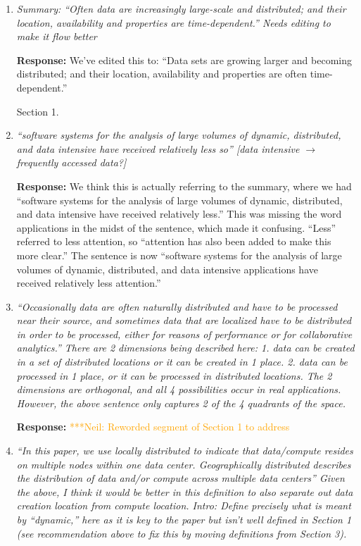 \documentclass{article}
\newcommand{\nchnote}[1]{ {\textcolor{orange} { ***Neil: #1 }}}
\newcommand{\nchnote}[1]{}
\begin{document}
\begin{enumerate}

\item \emph{Summary: ``Often data are increasingly large-scale and distributed; and their location, availability and properties are time-dependent.'' Needs editing to make it flow better}

\textbf{Response:} We've edited this to: ``Data sets are growing larger and becoming distributed; and their location, availability and properties are often time-dependent.''

\hspace{-0.7cm}Section 1. 

\item \emph{``software systems for the analysis of large volumes of dynamic, distributed, and data intensive have received relatively less so'' [data intensive $\rightarrow$ frequently accessed data?]}

\textbf{Response:} We think this is actually referring to the summary, where we had ``software systems for the analysis of large volumes of dynamic, distributed, and data intensive have received relatively less.''  This was missing the word applications in the midst of the sentence, which made it confusing. ``Less'' referred to less attention, so ``attention has also been added to make this more clear.'' The sentence is now ``software systems for the analysis of large volumes of dynamic, distributed, and data intensive applications have received relatively less attention.''

\item \emph{``Occasionally data are often naturally distributed and have to be processed near their source, and sometimes data that are localized have to be distributed in order to be processed, either for reasons of performance or for collaborative analytics.'' There are 2 dimensions being described here: 1. data can be created in a set of distributed locations or it can be created in 1 place. 2. data can be processed in 1 place, or it can be processed in distributed locations. The 2 dimensions are orthogonal, and all 4 possibilities occur in real applications. However, the above sentence only captures 2 of the 4 quadrants of the space.}

\textbf{Response:} \nchnote{Reworded segment of Section 1 to address}  

\item \emph{``In this paper, we use locally distributed to indicate that data/compute resides on multiple nodes within one data center. Geographically distributed describes the distribution of data and/or compute across multiple data centers'' Given the above, I think it would be better in this definition to also separate out data creation location from compute location. Intro: Define precisely what is meant by ``dynamic,'' here as it is key to the paper but isn't well defined in Section 1 (see recommendation above to fix this by moving definitions from Section 3).}


\end{enumerate}
\end{document}
